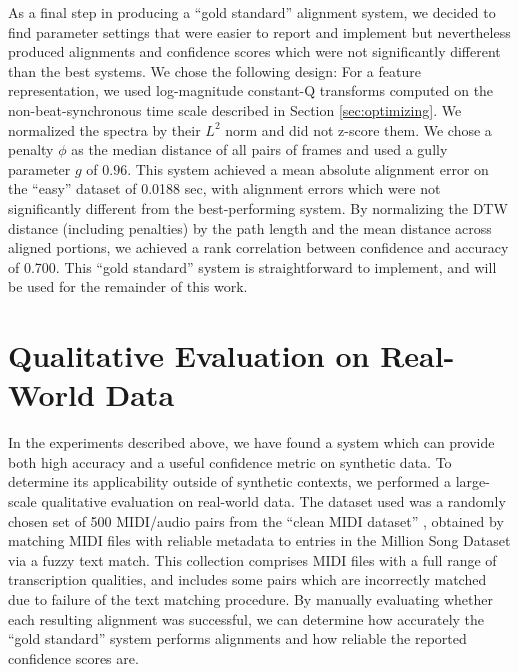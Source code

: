 \documentclass{article}
\begin{document}
As a final step in producing a ``gold standard'' alignment system, we decided to find parameter settings that were easier to report and implement but nevertheless produced alignments and confidence scores which were not significantly different than the best systems.
We chose the following design: For a feature representation, we used log-magnitude constant-Q transforms computed on the non-beat-synchronous time scale described in Section \ref{sec:optimizing}.
We normalized the spectra by their $L^2$ norm and did not z-score them.
We chose a penalty $\phi$ as the median distance of all pairs of frames and used a gully parameter $g$ of $0.96$.
This system achieved a mean absolute alignment error on the ``easy'' dataset of 0.0188 sec, with alignment errors which were not significantly different from the best-performing system.
By normalizing the DTW distance (including penalties) by the path length and the mean distance across aligned portions, we achieved a rank correlation between confidence and accuracy of 0.700.
This ``gold standard'' system is straightforward to implement, and will be used for the remainder of this work.

\section{Qualitative Evaluation on Real-World Data}
\label{sec:qualitative}

In the experiments described above, we have found a system which can provide both high accuracy and a useful confidence metric on synthetic data.
To determine its applicability outside of synthetic contexts, we performed a large-scale qualitative evaluation on real-world data.
The dataset used was a randomly chosen set of 500 MIDI/audio pairs from the ``clean MIDI dataset'' \cite{raffel2015large}, obtained by matching MIDI files with reliable metadata to entries in the Million Song Dataset \cite{bertin2011million} via a fuzzy text match.
This collection comprises MIDI files with a full range of transcription qualities, and includes some pairs which are incorrectly matched due to failure of the text matching procedure.
By manually evaluating whether each resulting alignment was successful, we can determine how accurately the ``gold standard'' system performs alignments and how reliable the reported confidence scores are.
\end{document}
